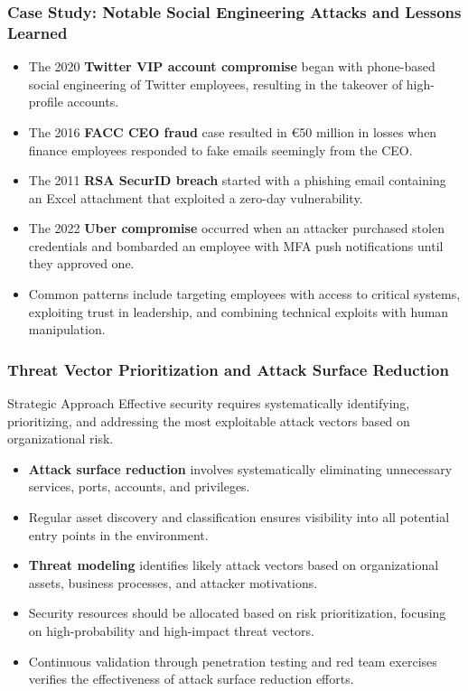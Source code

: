 \documentclass{beamer}
\begin{document}
\begin{frame}
    \frametitle{Case Study: Notable Social Engineering Attacks and Lessons Learned}
    
    \begin{itemize}
        \item The 2020 \textbf{Twitter VIP account compromise} began with phone-based social engineering of Twitter employees, resulting in the takeover of high-profile accounts.
        \item The 2016 \textbf{FACC CEO fraud} case resulted in €50 million in losses when finance employees responded to fake emails seemingly from the CEO.
        \item The 2011 \textbf{RSA SecurID breach} started with a phishing email containing an Excel attachment that exploited a zero-day vulnerability.
        \item The 2022 \textbf{Uber compromise} occurred when an attacker purchased stolen credentials and bombarded an employee with MFA push notifications until they approved one.
        \item Common patterns include targeting employees with access to critical systems, exploiting trust in leadership, and combining technical exploits with human manipulation.
    \end{itemize}
\end{frame}

\begin{frame}
    \frametitle{Threat Vector Prioritization and Attack Surface Reduction}
    
    \begin{block}{Strategic Approach}
        Effective security requires systematically identifying, prioritizing, and addressing the most exploitable attack vectors based on organizational risk.
    \end{block}
    
    \begin{itemize}
        \item \textbf{Attack surface reduction} involves systematically eliminating unnecessary services, ports, accounts, and privileges.
        \item Regular asset discovery and classification ensures visibility into all potential entry points in the environment.
        \item \textbf{Threat modeling} identifies likely attack vectors based on organizational assets, business processes, and attacker motivations.
        \item Security resources should be allocated based on risk prioritization, focusing on high-probability and high-impact threat vectors.
        \item Continuous validation through penetration testing and red team exercises verifies the effectiveness of attack surface reduction efforts.
    \end{itemize}
\end{frame}
\end{document}
